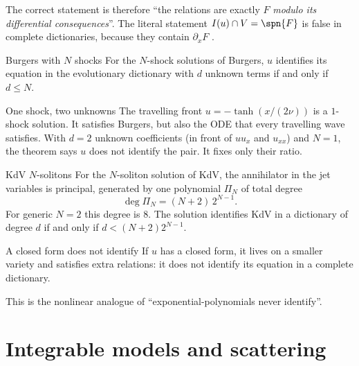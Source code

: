 The correct statement is therefore ``the relations are exactly $F$ \emph{modulo its differential consequences}''. The literal statement $I(u)\cap V=\spn\{F\}$ is false in complete dictionaries, because they contain $\partial_xF$  \proved.

\begin{theorem}{Burgers with $N$ shocks  \proved}\label{thm:burgersN}
For the $N$-shock solutions of Burgers, $u$ identifies its equation in the evolutionary dictionary with $d$ unknown terms if and only if $d\le N$.

\end{theorem}

\begin{example}{One shock, two unknowns}
The travelling front $u=-\tanh(x/(2\nu))$ is a $1$-shock solution. It satisfies Burgers, but also the ODE that every travelling wave satisfies. With $d=2$ unknown coefficients (in front of $uu_x$ and $u_{xx}$) and $N=1$, the theorem says $u$ does not identify the pair. It fixes only their ratio.
\end{example}

\begin{theorem}{KdV $N$-solitons  }\label{thm:kdv}
For the $N$-soliton solution of KdV, the annihilator in the jet variables is principal, generated by one polynomial $\Pi_N$ of total degree
\[
\deg\Pi_N=(N+2)\,2^{N-1}.
\]
For generic $N=2$ this degree is $8$. The solution identifies KdV in a dictionary of degree $d$ if and only if $d<(N+2)2^{N-1}$.

\end{theorem}

\begin{proposition}{A closed form does not identify  \proved}
If $u$ has a closed form, it lives on a smaller variety and satisfies extra relations: it does not identify its equation in a complete dictionary.

\end{proposition}

This is the nonlinear analogue of ``exponential-polynomials never identify''.

\section{Integrable models and scattering}


